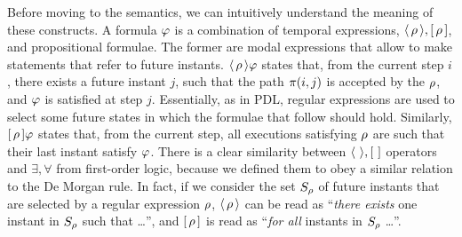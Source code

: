 Before moving to the semantics, we can intuitively understand the meaning of
these constructs. A \ldl{} formula $\varphi$ is a combination of temporal
expressions, $\langle\, {\rho} \,\rangle, [\, {\rho} \,]$, and propositional formulae.
The former are modal expressions that allow to make statements that refer to
future instants. $\langle\, {\rho} \,\rangle\varphi$ states that, from the current
step $i$, there exists a future instant $j$, such that the path $\pi(i, j)$
is accepted by the \re{} $\rho$, and $\varphi$ is satisfied at step $j$.
Essentially, as in PDL, regular expressions are used to select some future
states in which the formulae that follow should hold. Similarly,
$[\, {\rho} \,]\varphi$ states that, from the current step, all executions
satisfying $\rho$ are such that their last instant satisfy $\varphi$.
There is a clear similarity between $\langle\, {} \,\rangle, [\, {} \,]$ operators and
$\exists, \forall$ from first-order logic, because we defined them to obey a
similar relation to the De Morgan rule. In fact, if we consider the set
$S_\rho$ of future instants that are selected by a regular expression
$\rho$, $\langle\, {\rho} \,\rangle$ can be read as ``\emph{there exists} one instant
in $S_\rho$ such that \dots'', and $[\, {\rho} \,]$ is read as ``\emph{for
all} instants in $S_\rho$ \dots''.

